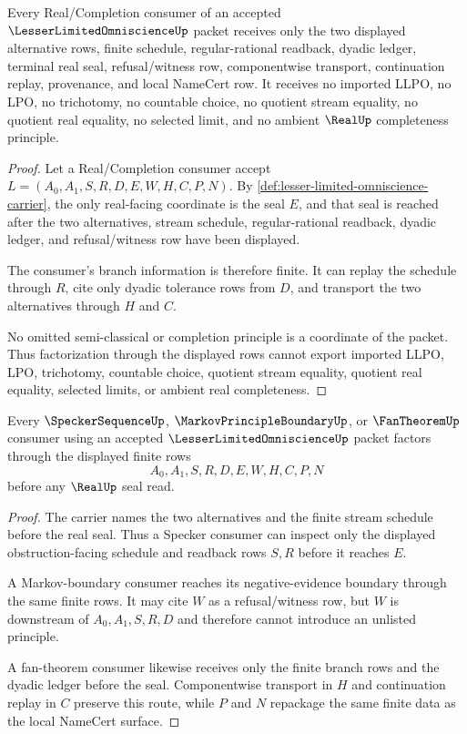 \begin{theorem}
\label{thm:lesser-limited-omniscience-nonescape}
Every Real/Completion consumer of an accepted $\LesserLimitedOmniscienceUp$ packet receives only the two displayed alternative rows, finite schedule, regular-rational readback, dyadic ledger, terminal real seal, refusal/witness row, componentwise transport, continuation replay, provenance, and local NameCert row. It receives no imported LLPO, no LPO, no trichotomy, no countable choice, no quotient stream equality, no quotient real equality, no selected limit, and no ambient $\RealUp$ completeness principle.
\end{theorem}
\begin{proof}
Let a Real/Completion consumer accept $L=(A_0,A_1,S,R,D,E,W,H,C,P,N)$. By \autoref{def:lesser-limited-omniscience-carrier}, the only real-facing coordinate is the seal $E$, and that seal is reached after the two alternatives, stream schedule, regular-rational readback, dyadic ledger, and refusal/witness row have been displayed.

The consumer's branch information is therefore finite. It can replay the schedule through $R$, cite only dyadic tolerance rows from $D$, and transport the two alternatives through $H$ and $C$.

No omitted semi-classical or completion principle is a coordinate of the packet. Thus factorization through the displayed rows cannot export imported LLPO, LPO, trichotomy, countable choice, quotient stream equality, quotient real equality, selected limits, or ambient real completeness.
\end{proof}

\begin{theorem}
\label{thm:lesser-limited-omniscience-specker-markov-fan-boundary}
Every $\SpeckerSequenceUp$, $\MarkovPrincipleBoundaryUp$, or $\FanTheoremUp$ consumer using an accepted $\LesserLimitedOmniscienceUp$ packet factors through the displayed finite rows
$$
A_0,A_1,S,R,D,E,W,H,C,P,N
$$
before any $\RealUp$ seal read.
\end{theorem}
\begin{proof}
The carrier names the two alternatives and the finite stream schedule before the real seal. Thus a Specker consumer can inspect only the displayed obstruction-facing schedule and readback rows $S,R$ before it reaches $E$.

A Markov-boundary consumer reaches its negative-evidence boundary through the same finite rows. It may cite $W$ as a refusal/witness row, but $W$ is downstream of $A_0,A_1,S,R,D$ and therefore cannot introduce an unlisted principle.

A fan-theorem consumer likewise receives only the finite branch rows and the dyadic ledger before the seal. Componentwise transport in $H$ and continuation replay in $C$ preserve this route, while $P$ and $N$ repackage the same finite data as the local NameCert surface.
\end{proof}

